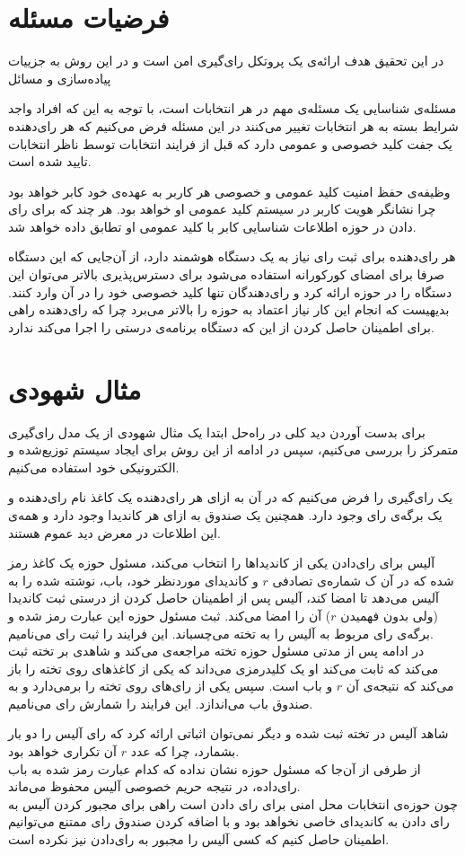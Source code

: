 \section{فرضیات مسئله}
در این تحقیق هدف ارائه‌ی یک پروتکل رای‌گیری امن است و در این روش به جزییات پیاده‌سازی و مسائل 
\par
مسئله‌ی شناسایی یک مسئله‌ی مهم در هر انتخابات است، با توجه به این که افراد واجد شرایط بسته به هر انتخابات تغییر می‌کنند در این مسئله فرض می‌کنیم که هر رای‌دهنده یک جفت کلید خصوصی و عمومی دارد که قبل از فرایند انتخابات توسط ناظر انتخابات تایید شده است. 
\par
وظیفه‌ی حفظ امنیت کلید عمومی و خصوصی هر کاربر به عهده‌ی خود کابر خواهد بود چرا نشانگر هویت کاربر در سیستم‌ کلید عمومی او خواهد بود. هر چند که برای رای دادن در حوزه اطلاعات شناسایی کابر با کلید عمومی او تطابق داده خواهد شد.
\par
هر رای‌دهنده برای ثبت رای نیاز به یک دستگاه هوشمند دارد، از آن‌جایی که این دستگاه صرفا برای امضای کورکورانه استفاده می‌شود برای دسترس‌پذیری بالاتر می‌توان این دستگاه را در حوزه ارائه کرد و رای‌دهندگان تنها کلید خصوصی خود را در آن وارد کنند. بدیهیست که انجام این کار نیاز اعتماد به حوزه را بالاتر می‌برد چرا که رای‌دهنده راهی برای اطمینان حاصل کردن از این که دستگاه برنامه‌ی درستی را اجرا می‌کند ندارد.

\section{مثال شهودی}
برای بدست آوردن دید کلی در راه‌حل ابتدا یک مثال شهودی از یک مدل رای‌گیری متمرکز را بررسی می‌کنیم،‌ سپس در ادامه از این روش برای ایجاد سیستم توزیع‌شده و الکترونیکی خود استفاده می‌کنیم.
\par
یک رای‌گیری را فرض می‌کنیم که در آن به ازای هر رای‌دهنده یک کاغذ نام رای‌دهنده و یک برگه‌ی رای وجود دارد. همچنین یک صندوق به ازای هر کاندیدا وجود دارد و همه‌ی این اطلاعات در معرض دید عموم هستند. 
\par
آلیس برای رای‌دادن یکی از کاندیداها را انتخاب می‌کند، مسئول حوزه یک کاغذ رمز شده که در آن ک شماره‌ی تصادفی $r$ و کاندیدای موردنظر خود، باب، نوشته شده را به آلیس می‌دهد تا امضا کند، آلیس پس از اطمینان حاصل کردن از درستی ثبت کاندیدا (ولی بدون فهمیدن $r$) آن را امضا می‌کند. ثبث مسئول حوزه این عبارت رمز شده و برگه‌ی رای مربوط به آلیس را به تخته می‌چسباند. این فرایند را ثبت رای‌ می‌نامیم.
\\
در ادامه پس از مدتی مسئول حوزه تخته مراجعه‌ی می‌کند و شاهدی بر تخته ثبت می‌کند که ثابت می‌کند او یک کلیدرمزی می‌داند که یکی از کاغذ‌های روی تخته را باز می‌کند که نتیجه‌ی آن $r$ و باب است. سپس یکی از رای‌های روی تخته را برمی‌دارد و به صندوق باب می‌اندازد. این فرایند را شمارش رای‌ می‌نامیم.
\par
 شاهد آلیس در تخته ثبت شده و دیگر نمی‌توان اثباتی ارائه کرد که رای آلیس را دو بار بشمارد، چرا که عدد $r$ آن تکراری خواهد بود.
\\
از طرفی از آن‌جا که مسئول حوزه نشان نداده که کدام عبارت رمز شده به باب رای‌داده، در نتیجه حریم خصوصی آلیس محفوظ می‌ماند.
\\ 
چون حوزه‌ی انتخابات محل امنی برای رای‌ دادن است راهی برای مجبور کردن آلیس به رای دادن به کاندیدای خاصی نخواهد بود و با اضافه کردن صندوق رای ممتنع می‌توانیم اطمینان حاصل کنیم که کسی آلیس را مجبور به رای‌دادن نیز نکرده است. 

